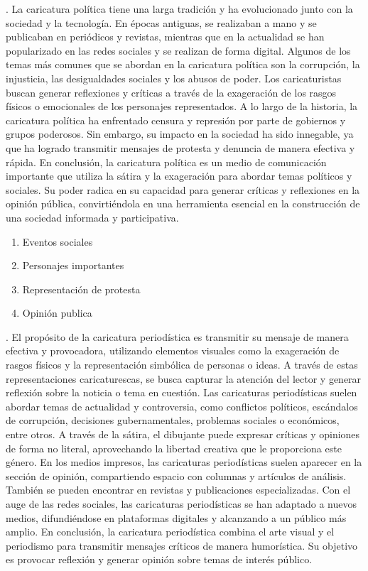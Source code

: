 \documentclass[12pt,a4paper]{article}
\begin{document}
\noindent\textbf{\dimiiii}.	La caricatura política tiene una larga tradición y ha evolucionado junto con la sociedad y la tecnología. En épocas antiguas, se realizaban a mano y se publicaban en periódicos y revistas, mientras que en la actualidad se han popularizado en las redes sociales y se realizan de forma digital.
Algunos de los temas más comunes que se abordan en la caricatura política son la corrupción, la injusticia, las desigualdades sociales y los abusos de poder. Los caricaturistas buscan generar reflexiones y críticas a través de la exageración de los rasgos físicos o emocionales de los personajes representados.
A lo largo de la historia, la caricatura política ha enfrentado censura y represión por parte de gobiernos y grupos poderosos. Sin embargo, su impacto en la sociedad ha sido innegable, ya que ha logrado transmitir mensajes de protesta y denuncia de manera efectiva y rápida.
En conclusión, la caricatura política es un medio de comunicación importante que utiliza la sátira y la exageración para abordar temas políticos y sociales. Su poder radica en su capacidad para generar críticas y reflexiones en la opinión pública, convirtiéndola en una herramienta esencial en la construcción de una sociedad informada y participativa.

\begin{enumerate}
\item  Eventos sociales
\item  Personajes importantes
\item  Representación de protesta
\item  Opinión publica
\end{enumerate}

\noindent\textbf{\dimiii}.	El propósito de la caricatura periodística es transmitir su mensaje de manera efectiva y provocadora, utilizando elementos visuales como la exageración de rasgos físicos y la representación simbólica de personas o ideas. A través de estas representaciones caricaturescas, se busca capturar la atención del lector y generar reflexión sobre la noticia o tema en cuestión.
Las caricaturas periodísticas suelen abordar temas de actualidad y controversia, como conflictos políticos, escándalos de corrupción, decisiones gubernamentales, problemas sociales o económicos, entre otros. A través de la sátira, el dibujante puede expresar críticas y opiniones de forma no literal, aprovechando la libertad creativa que le proporciona este género.
En los medios impresos, las caricaturas periodísticas suelen aparecer en la sección de opinión, compartiendo espacio con columnas y artículos de análisis. También se pueden encontrar en revistas y publicaciones especializadas. Con el auge de las redes sociales, las caricaturas periodísticas se han adaptado a nuevos medios, difundiéndose en plataformas digitales y alcanzando a un público más amplio.
En conclusión, la caricatura periodística combina el arte visual y el periodismo para transmitir mensajes críticos de manera humorística. Su objetivo es provocar reflexión y generar opinión sobre temas de interés público.
\end{document}
